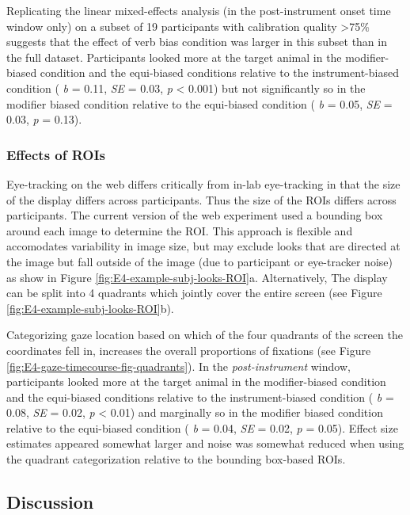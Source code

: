 \documentclass[
  man,floatsintext]{apa6}
\begin{document}
Replicating the linear mixed-effects analysis (in the post-instrument onset time window only) on a subset of 19 participants with calibration quality \textgreater75\% suggests that the effect of verb bias condition was larger in this subset than in the full dataset.
Participants looked more at the target animal in the modifier-biased condition and the equi-biased conditions relative to the instrument-biased condition ( \emph{b} = 0.11, \emph{SE} = 0.03, \emph{p} \textless{} 0.001) but not significantly so in the modifier biased condition relative to the equi-biased condition ( \emph{b} = 0.05, \emph{SE} = 0.03, \emph{p} = 0.13).

\hypertarget{effects-of-rois-1}{%
\subsubsection{Effects of ROIs}\label{effects-of-rois-1}}

Eye-tracking on the web differs critically from in-lab eye-tracking in that the size of the display differs across participants. Thus the size of the ROIs differs across participants. The current version of the web experiment used a bounding box around each image to determine the ROI.
This approach is flexible and accomodates variability in image size, but may exclude looks that are directed at the image but fall outside of the image (due to participant or eye-tracker noise) as show in Figure \ref{fig:E4-example-subj-looks-ROI}a. Alternatively, The display can be split into 4 quadrants which jointly cover the entire screen (see Figure \ref{fig:E4-example-subj-looks-ROI}b).

Categorizing gaze location based on which of the four quadrants of the screen the coordinates fell in, increases the overall proportions of fixations (see Figure \ref{fig:E4-gaze-timecourse-fig-quadrants}). In the \emph{post-instrument} window, participants looked more at the target animal in the modifier-biased condition and the equi-biased conditions relative to the instrument-biased condition ( \emph{b} = 0.08, \emph{SE} = 0.02, \emph{p} \textless{} 0.01) and marginally so in the modifier biased condition relative to the equi-biased condition ( \emph{b} = 0.04, \emph{SE} = 0.02, \emph{p} = 0.05). Effect size estimates appeared somewhat larger and noise was somewhat reduced when using the quadrant categorization relative to the bounding box-based ROIs.

\hypertarget{discussion-3}{%
\subsection{Discussion}\label{discussion-3}}
\end{document}
